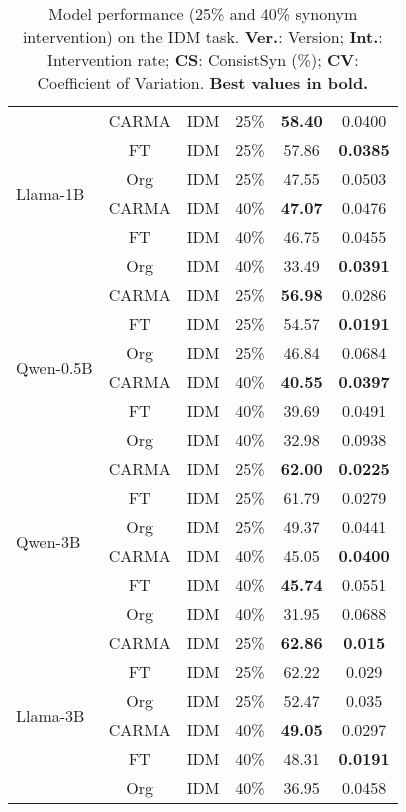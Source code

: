 \begin{table}[h]
\begin{tabular}{|l|c|c|c|c|c|}
\multirow{6}{*}{Llama-1B} 
& CARMA & IDM & 25\% & \textbf{58.40 }& 0.0400 \\
& FT & IDM & 25\% & 57.86 &  \textbf{0.0385}\\
& Org & IDM & 25\% & 47.55 & 0.0503 \\
\cline{2-6}
& CARMA & IDM & 40\% & \textbf{47.07} & 0.0476 \\
& FT & IDM & 40\% & 46.75 & 0.0455 \\
& Org & IDM & 40\% & 33.49 & \textbf{0.0391} \\
\hline

\multirow{6}{*}{Qwen-0.5B} 
& CARMA & IDM & 25\% & \textbf{56.98} & 0.0286 \\
& FT & IDM & 25\% & 54.57 & \textbf{0.0191} \\
& Org & IDM & 25\% & 46.84 & 0.0684 \\
\cline{2-6}
& CARMA & IDM & 40\% & \textbf{40.55} & \textbf{0.0397} \\
& FT & IDM & 40\% & 39.69 & 0.0491 \\
& Org & IDM & 40\% & 32.98 & 0.0938 \\
\hline



\multirow{6}{*}{Qwen-3B} 
& CARMA & IDM & 25\% & \textbf{62.00} & \textbf{0.0225} \\
& FT & IDM & 25\% & 61.79 & 0.0279 \\
& Org & IDM & 25\% & 49.37& 0.0441 \\
\cline{2-6}
& CARMA & IDM & 40\% & 45.05 & \textbf{0.0400} \\
& FT & IDM & 40\% & \textbf{45.74} & 0.0551 \\
& Org & IDM & 40\% & 31.95 & 0.0688 \\
\hline


\multirow{6}{*}{Llama-3B} 
& CARMA & IDM & 25\% & \textbf{62.86} & \textbf{0.015} \\
& FT & IDM & 25\% & 62.22 & 0.029 \\
& Org & IDM & 25\% & 52.47 & 0.035 \\
\cline{2-6}
& CARMA & IDM & 40\% &\textbf{ 49.05 }& 0.0297 \\
& FT & IDM & 40\% & 48.31& \textbf{0.0191} \\
& Org & IDM & 40\% & 36.95 & 0.0458 \\

\hline
\end{tabular}
\caption{Model performance (25\% and 40\% synonym intervention) on the IDM task. \textbf{Ver.}: Version; \textbf{Int.}: Intervention rate; \textbf{CS}: ConsistSyn (\%); \textbf{CV}: Coefficient of Variation. \textbf{Best values in bold.}}
\label{tab:synonym_results_appendix_IDM}
\end{table}

